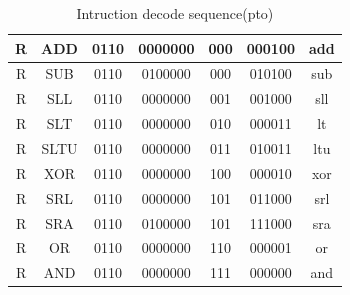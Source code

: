 \documentclass[12pt,a4paper]{report}
\begin{document}
\begin{table}[!ht]
\begin{tabular}{|c|c|c|c|c|c|c|}
		R                                                              & ADD                & 0110  & 0000000 & 000    & 000100 & add          \\ \hline
		R                                                              & SUB                & 0110  & 0100000 & 000    & 010100 & sub          \\ \hline
		R                                                              & SLL                & 0110  & 0000000 & 001    & 001000 & sll          \\ \hline
		R                                                              & SLT                & 0110  & 0000000 & 010    & 000011 & lt           \\ \hline
		R                                                              & SLTU               & 0110  & 0000000 & 011    & 010011 & ltu          \\ \hline
		R                                                              & XOR                & 0110  & 0000000 & 100    & 000010 & xor          \\ \hline
		R                                                              & SRL                & 0110  & 0000000 & 101    & 011000 & srl          \\ \hline
		R                                                              & SRA                & 0110  & 0100000 & 101    & 111000 & sra          \\ \hline
		R                                                              & OR                 & 0110  & 0000000 & 110    & 000001 & or           \\ \hline
		R                                                              & AND                & 0110  & 0000000 & 111    & 000000 & and          \\ \hline
	\end{tabular}
	\caption{Intruction decode sequence(pto)}
	\label{tab:aluctl(a)}
\end{table}                                                         
\end{document}
